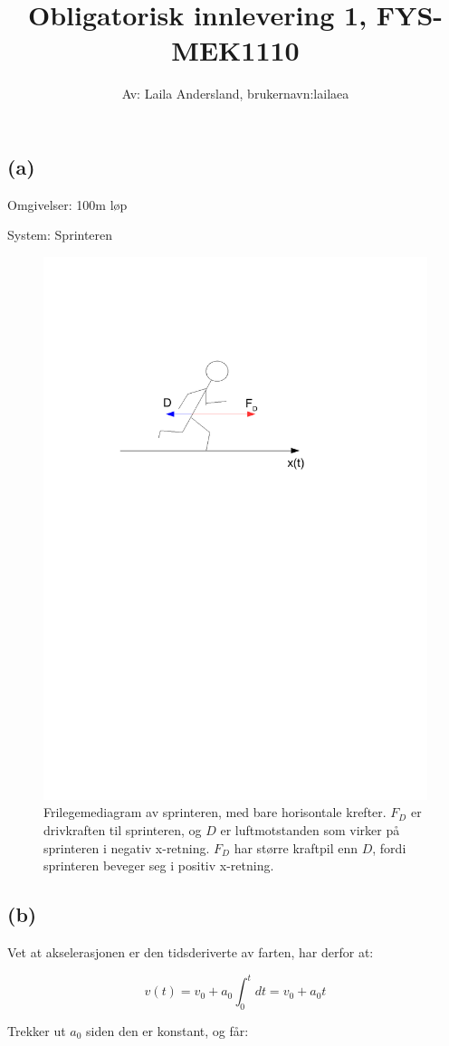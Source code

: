 \documentclass[a4paper,norsk,12pt]{article}
\title{\vspace{-4.0cm} \textbf{Obligatorisk innlevering 1, FYS-MEK1110}}
\author{Av: Laila Andersland, brukernavn:lailaea}
\begin{document}
\maketitle


\subsection*{(a)}

\noindent

Omgivelser: 100m løp 

System: Sprinteren

\begin{figure}[H]
\centering
	\includegraphics[width=\linewidth, trim={5cm 17cm 5cm 5cm},clip, width=0.5\textwidth,]{sprinter.pdf}
	\caption{Frilegemediagram av sprinteren, med bare horisontale krefter. $F_D$ er drivkraften til sprinteren, og $D$ er luftmotstanden som virker på sprinteren i negativ x-retning. $F_D$ har større kraftpil enn $D$, fordi sprinteren beveger seg i positiv x-retning.}			
	\label{fig:plot1}
\end{figure}

\subsection*{(b)}

\noindent

Vet at akselerasjonen er den tidsderiverte av farten, har derfor at:

$$ v(t) = v_0 + {a_0} \int_0^t dt = v_0 + a_0 t $$

Trekker ut $a_0$ siden den er konstant, og får:
\end{document}
